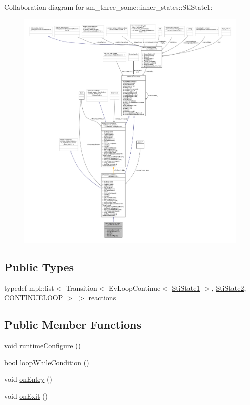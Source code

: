 Collaboration diagram for sm\+\_\+three\+\_\+some\+:\+:inner\+\_\+states\+:\+:Sti\+State1\+:
\nopagebreak
\begin{figure}[H]
\begin{center}
\leavevmode
\includegraphics[width=350pt]{structsm__three__some_1_1inner__states_1_1StiState1__coll__graph}
\end{center}
\end{figure}
\subsection*{Public Types}
\begin{DoxyCompactItemize}
\item 
typedef mpl\+::list$<$ Transition$<$ Ev\+Loop\+Continue$<$ \hyperlink{structsm__three__some_1_1inner__states_1_1StiState1}{Sti\+State1} $>$, \hyperlink{structsm__three__some_1_1inner__states_1_1StiState2}{Sti\+State2}, C\+O\+N\+T\+I\+N\+U\+E\+L\+O\+OP $>$ $>$ \hyperlink{structsm__three__some_1_1inner__states_1_1StiState1_a3880ea2992d3e5153deec7adafc52d8e}{reactions}
\end{DoxyCompactItemize}
\subsection*{Public Member Functions}
\begin{DoxyCompactItemize}
\item 
void \hyperlink{structsm__three__some_1_1inner__states_1_1StiState1_aa21f1eeac8b6c9685ad9a01aebc939aa}{runtime\+Configure} ()
\item 
\hyperlink{classbool}{bool} \hyperlink{structsm__three__some_1_1inner__states_1_1StiState1_aa57c154b9243b49328c11ba48c5d9779}{loop\+While\+Condition} ()
\item 
void \hyperlink{structsm__three__some_1_1inner__states_1_1StiState1_a678a34ba0258c496f873012299e65b98}{on\+Entry} ()
\item 
void \hyperlink{structsm__three__some_1_1inner__states_1_1StiState1_a28b7cf146965879086d459d3cca44ace}{on\+Exit} ()
\end{DoxyCompactItemize}
